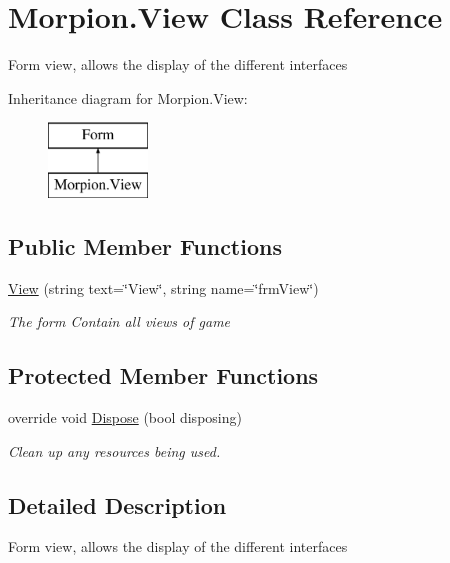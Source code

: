 \hypertarget{class_morpion_1_1_view}{}\section{Morpion.\+View Class Reference}
\label{class_morpion_1_1_view}


Form view, allows the display of the different interfaces  


Inheritance diagram for Morpion.\+View\+:\begin{figure}[H]
\begin{center}
\leavevmode
\includegraphics[height=2.000000cm]{class_morpion_1_1_view}
\end{center}
\end{figure}
\subsection*{Public Member Functions}
\begin{DoxyCompactItemize}
\item 
\hyperlink{class_morpion_1_1_view_ab8a0a6c6141f31f7e175ba5ad49140c3}{View} (string text=\char`\"{}View\char`\"{}, string name=\char`\"{}frm\+View\char`\"{})
\begin{DoxyCompactList}\small\item\em The form Contain all views of game \end{DoxyCompactList}\end{DoxyCompactItemize}
\subsection*{Protected Member Functions}
\begin{DoxyCompactItemize}
\item 
override void \hyperlink{class_morpion_1_1_view_a3c537c54a79236b4cfd9e78415dd48f5}{Dispose} (bool disposing)
\begin{DoxyCompactList}\small\item\em Clean up any resources being used. \end{DoxyCompactList}\end{DoxyCompactItemize}


\subsection{Detailed Description}
Form view, allows the display of the different interfaces 



